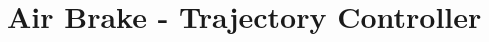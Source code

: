 \documentclass[10pt]{extarticle}
\numberwithin{equation}{subsection}
\begin{document}
\tableofcontents

\newpage \section{Air Brake - Trajectory Controller}
 \newpage
 \newpage

%  
% 
% 
% 
\end{document}
